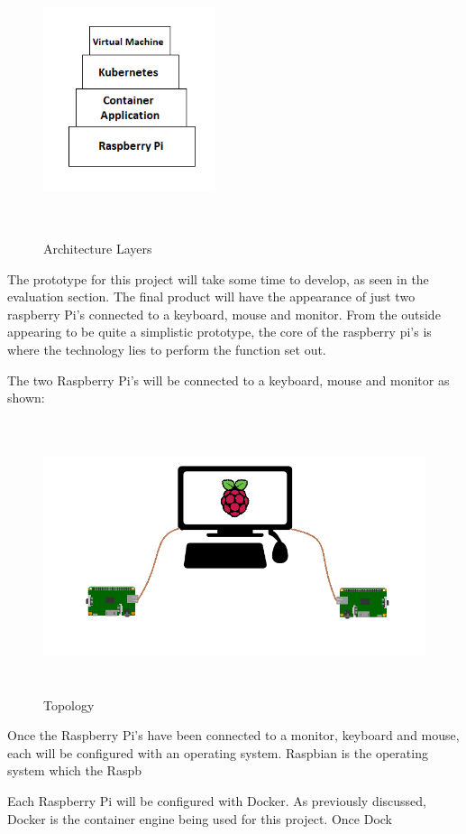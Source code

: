 \begin{figure}[ht]
    \centering
     \includegraphics[width=0.45\textwidth, height=8cm]{Figures/Architecture.PNG}
  \caption[Architecture Layers]{Architecture Layers \cite{Reference19}}
 \label{fig:Architecture Layers}
\end{figure}

The prototype for this project will take some time to develop, as seen in the evaluation section. The final product will have the appearance of just two raspberry Pi's connected to a keyboard, mouse and monitor. From the outside appearing to be quite a simplistic prototype, the core of the raspberry pi's is where the technology lies to perform the function set out. 

The two Raspberry Pi's will be connected to a keyboard, mouse and monitor as shown:


\begin{figure}[ht]
    \centering
     \includegraphics[width=1.0\textwidth,  height=8cm]{Figures/Topo.PNG}
  \caption[Topology]{Topology \cite{Reference19}}
 \label{fig:Topology}
\end{figure}


Once the Raspberry Pi's have been connected to a monitor, keyboard and mouse, each will be configured with an operating system. Raspbian is the operating system which the Raspb

Each Raspberry Pi will be configured with Docker. As previously discussed, Docker is the container engine being used for this project. Once Dock